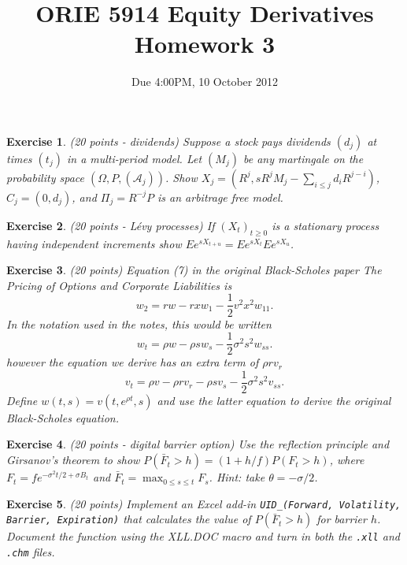 \documentclass[11pt,fleqn]{amsproc}
\renewcommand{\AA}{{\mathcal A}}
\newtheorem{xca}{Exercise}
\begin{document}
\title{ORIE 5914 Equity Derivatives Homework 3}
\author{Due 4:00PM, 10 October 2012}

\maketitle

\begin{xca}{(20 points - dividends)}
Suppose a stock pays dividends \((d_j)\) at times \((t_j)\) in a multi-period model.
Let \((M_j)\) be any martingale on the probability space \((\Omega, P, (\AA_j))\). Show
\(X_j = (R^j, sR^jM_j - \sum_{i \le j} d_iR^{j - i})\), \(C_j = (0, d_j)\), and
\(\Pi_j = R^{-j}P\) is an arbitrage free model.
\end{xca}

\begin{xca}{(20 points - L\'evy processes)}
If \((X_t)_{t\ge0}\) is a stationary process having independent increments
show \(Ee^{sX_{t + u}} = Ee^{sX_t} Ee^{sX_u}\).
\end{xca}

\begin{xca}{(20 points)}
Equation (7) in the original Black-Scholes paper {\it The Pricing of Options and Corporate Liabilities} is 
\[w_2 = r w - rxw_1 - \frac{1}{2}v^2x^2 w_{11}.\]
In the notation used in the notes, this would be written 
\[w_t = \rho w - \rho s w_s - \frac{1}{2}\sigma^2s^2 w_{ss}.\]
however the equation we derive has an extra term of \(\rho r v_r\)
\[v_t = \rho v - \rho rv_r -\rho s v_s - \frac{1}{2}\sigma^2s^2 v_{ss}.\]
Define \(w(t, s) = v(t, e^{\rho t}, s)\) and use the latter equation to
derive the original Black-Scholes equation.
\end{xca}

\begin{xca}{(20 points - digital barrier option)}
Use the reflection principle and Girsanov's theorem to show
\(P(\bar{F}_t > h) = (1 + h/f)P(F_t > h)\), where \(F_t = fe^{-\sigma^2t/2 + \sigma B_t}\)
and \(\bar{F}_t = \max_{0\le s\le t} F_s\). {\rm Hint: take \(\theta = -\sigma/2\).}
\end{xca}

\begin{xca}{(20 points)}
Implement an Excel add-in {\tt UID\_(Forward, Volatility, Barrier, Expiration)} that
calculates the value of \(P(\bar{F}_t > h)\) for barrier \(h\). Document the function
using the XLL.DOC macro and turn in both the {\tt .xll} and {\tt .chm} files.
\end{xca}
\end{document}

